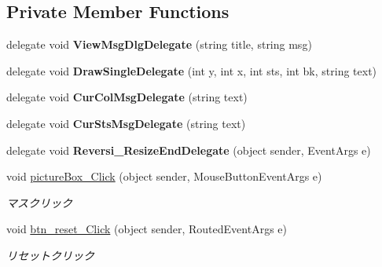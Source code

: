 \subsection*{Private Member Functions}
\begin{DoxyCompactItemize}
\item 
\mbox{\label{class_reversi_wpf_1_1_main_window_a0e8395f8250557e220e7991b1ab35f75}} 
delegate void {\bfseries View\+Msg\+Dlg\+Delegate} (string title, string msg)
\item 
\mbox{\label{class_reversi_wpf_1_1_main_window_a65ef9ec2bd0530c4174e5400417ba502}} 
delegate void {\bfseries Draw\+Single\+Delegate} (int y, int x, int sts, int bk, string text)
\item 
\mbox{\label{class_reversi_wpf_1_1_main_window_ae65f508538317670624e86938d8f97ac}} 
delegate void {\bfseries Cur\+Col\+Msg\+Delegate} (string text)
\item 
\mbox{\label{class_reversi_wpf_1_1_main_window_a42bb52b7954bd84a3d739975db7c2779}} 
delegate void {\bfseries Cur\+Sts\+Msg\+Delegate} (string text)
\item 
\mbox{\label{class_reversi_wpf_1_1_main_window_acd320193924986ad56929164d8a8d167}} 
delegate void {\bfseries Reversi\+\_\+\+Resize\+End\+Delegate} (object sender, Event\+Args e)
\item 
void \hyperlink{class_reversi_wpf_1_1_main_window_a7514a29baed5a572e78354addb9678bc}{picture\+Box\+\_\+\+Click} (object sender, Mouse\+Button\+Event\+Args e)
\begin{DoxyCompactList}\small\item\em マスクリック \end{DoxyCompactList}\item 
void \hyperlink{class_reversi_wpf_1_1_main_window_a9b7c6af889d570bc68dcd2cf981e4cf8}{btn\+\_\+reset\+\_\+\+Click} (object sender, Routed\+Event\+Args e)
\begin{DoxyCompactList}\small\item\em リセットクリック \end{DoxyCompactList}\item 
\mbox{\label{class_reversi_wpf_1_1_main_window_a0564837cd094d904f299ad5448a30682}} 

\end{DoxyCompactItemize}
